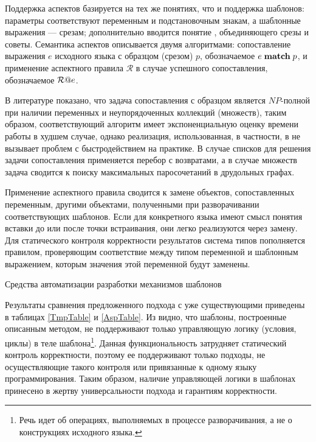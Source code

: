 Поддержка аспектов базируется на тех же понятиях, что и поддержка шаблонов: параметры соответствуют переменным и подстановочным знакам, а шаблонные выражения --- срезам; дополнительно вводится понятие , объединяющего срезы и советы. Семантика аспектов описывается двумя алгоритмами: сопоставление выражения $e$ исходного языка с образцом (срезом) $p$, обозначаемое $e \; \mathbf{match} \; p$, и применение аспектного правила $\mathcal{R}$ в случае успешного сопоставления, обозначаемое $\mathcal{R}@e$.

В литературе показано, что задача сопоставления с образцом является $NP$-полной при наличии переменных и неупорядоченных коллекций (множеств), таким образом, соответствующий алгоритм имеет экспоненциальную оценку времени работы в худшем случае, однако реализация, использованная, в частности, в \GRM{} не вызывает проблем с быстродействием на практике. В случае списков для решения задачи сопоставления применяется перебор с возвратами, а в случае множеств задача сводится к поиску максимальных паросочетаний в друдольных графах. 

Применение аспектного правила сводится к замене объектов, сопоставленных переменным, другими объектами, полученными при разворачивании соответствующих шаблонов. Если для конкретного языка имеют смысл понятия вставки до или после точки встраивания, они легко реализуются через замену.
Для статического контроля корректности результатов система типов пополняется правилом, проверяющим соответствие между типом переменной и шаблонным выражением, которым значения этой переменной будут заменены.

\begin{table}[htb]
	\centering
\newcommand{\dissonly}[1]{}
\newcommand{\size}{\small}

	\caption{Средства автоматизации разработки механизмов шаблонов}\label{TmpTable}
\end{table}

Результаты сравнения предложенного подхода с уже существующими приведены в таблицах \ref{TmpTable} и \ref{AspTable}. 
Из  видно, что шаблоны, построенные описанным методом, не поддерживают только управляющую логику (условия, циклы) в теле шаблона\footnote{Речь идет об операциях, выполняемых в процессе разворачивания, а не о конструкциях исходного языка.}. Данная функциональность затрудняет статический контроль корректности, поэтому ее поддерживают только подходы, не осуществляющие такого контроля или привязанные к одному языку программирования. Таким образом, наличие управляющей логики в шаблонах принесено в жертву универсальности подхода и гарантиям корректности. 

